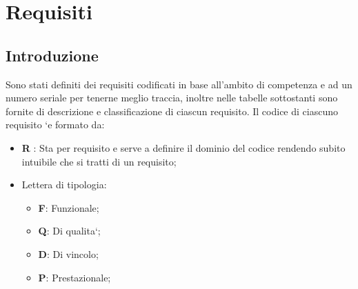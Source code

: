 
\section{Requisiti}
\subsection{Introduzione}
Sono stati definiti dei requisiti codificati in base all’ambito di competenza e ad un numero seriale per
tenerne meglio traccia, inoltre nelle tabelle sottostanti sono fornite di descrizione e classificazione di ciascun
requisito. Il codice di ciascuno requisito `e formato da:
\begin{itemize}
    \item \textbf{R} : Sta per requisito e serve a definire il dominio del codice rendendo subito intuibile che si tratti di
    un requisito;
    \item Lettera di tipologia:
    \begin{itemize}
        \item \textbf{F}: Funzionale;
        \item \textbf{Q}: Di qualita`;
        \item \textbf{D}: Di vincolo;
        \item \textbf{P}: Prestazionale;
    \end{itemize}
\end{itemize}
